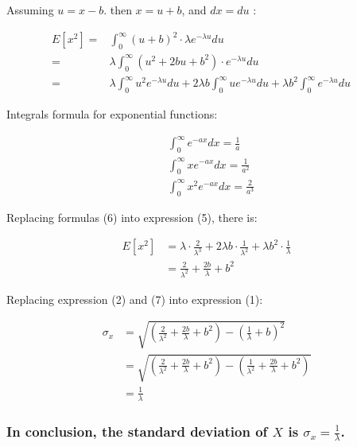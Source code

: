 \documentclass[
]{article}
\begin{document}
Assuming \(u=x-b\). then \(x=u+b\), and \(d x=d u\) :

\[
\begin{align*}
E\left[x^{2}\right]= & \int_{0}^{\infty}(u+b)^{2} \cdot \lambda e^{-\lambda u} d u \\
= & \lambda \int_{0}^{\infty}\left(u^{2}+2 b u+b^{2}\right) \cdot e^{-\lambda u} d u \\
= & \lambda \int_{0}^{\infty} u^{2} e^{-\lambda u} d u+2 \lambda b \int_{0}^{\infty} u e^{-\lambda u} d u  +\lambda b^{2} \int_{0}^{\infty} e^{-\lambda u} d u \quad  \tag{5}
\end{align*}
\]

Integrals formula for exponential functions:

\[
\begin{align*}
& \int_{0}^{\infty} e^{-a x} d x=\frac{1}{a} \\
& \int_{0}^{\infty} x e^{-a x} d x=\frac{1}{a^{2}} \\
& \int_{0}^{\infty} x^{2} e^{-a x} d x=\frac{2}{a^{3}} \tag{6}
\end{align*}
\]

Replacing formulas (6) into expression (5), there is:

\[
\begin{align*}
E\left[x^{2}\right] & =\lambda \cdot \frac{2}{\lambda^{3}}+2 \lambda b \cdot \frac{1}{\lambda^{2}}+\lambda b^{2} \cdot \frac{1}{\lambda} \\
& =\frac{2}{\lambda^{2}}+\frac{2 b}{\lambda}+b^{2} \tag{7}
\end{align*}
\]

Replacing expression (2) and (7) into expression (1):

\[
\begin{align*}
\sigma_{x} & =\sqrt{\left(\frac{2}{\lambda^{2}}+\frac{2 b}{\lambda}+b^{2}\right)-\left(\frac{1}{\lambda}+b\right)^{2}} \\
& =\sqrt{\left(\frac{2}{\lambda^{2}}+\frac{2 b}{\lambda}+b^{2}\right)-\left(\frac{1}{\lambda^{2}}+\frac{2 b}{\lambda}+b^{2}\right)} \\
& =\frac{1}{\lambda}
\end{align*}
\]

\subsubsection{\texorpdfstring{In conclusion, the standard deviation of
\(X\) is
\(\sigma_{x}=\frac{1}{\lambda}\).}{In conclusion, the standard deviation of X is \textbackslash sigma\_\{x\}=\textbackslash frac\{1\}\{\textbackslash lambda\}.}}\label{in-conclusion-the-standard-deviation-of-x-is-sigma_xfrac1lambda.}
\end{document}
